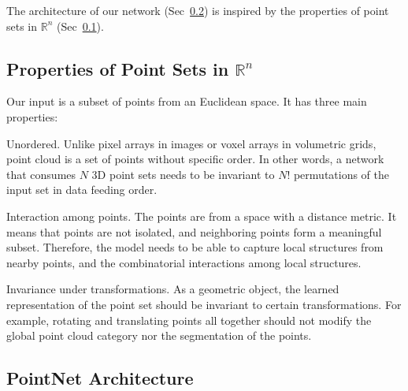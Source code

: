 The architecture of our network (Sec~\ref{sec:pointnet_arch}) is inspired by the properties of point sets in $\mathbb{R}^n$ (Sec~\ref{sec:point_set_property}). %

\subsection{Properties of Point Sets in $\mathbb{R}^n$}
\label{sec:point_set_property}
Our input is a subset of points from an Euclidean space. It has three main properties:

\bitem
\item Unordered.
Unlike pixel arrays in images or voxel arrays in volumetric grids, point cloud is a set of points without specific order. In other words, a network that consumes $N$ 3D point sets needs to be invariant to $N!$ permutations of the input set in data feeding order. 
\item Interaction among points. The points are from a space with a distance metric. It means that points are not isolated, and neighboring points form a meaningful subset. Therefore, the model needs to be able to capture local structures from nearby points, and the combinatorial interactions among local structures. 
\item Invariance under transformations.
As a geometric object, the learned representation of the point set should be invariant to certain transformations. For example, rotating and translating points all together should not modify the global point cloud category nor the segmentation of the points.
\eitem



\subsection{PointNet Architecture}
\label{sec:pointnet_arch}

